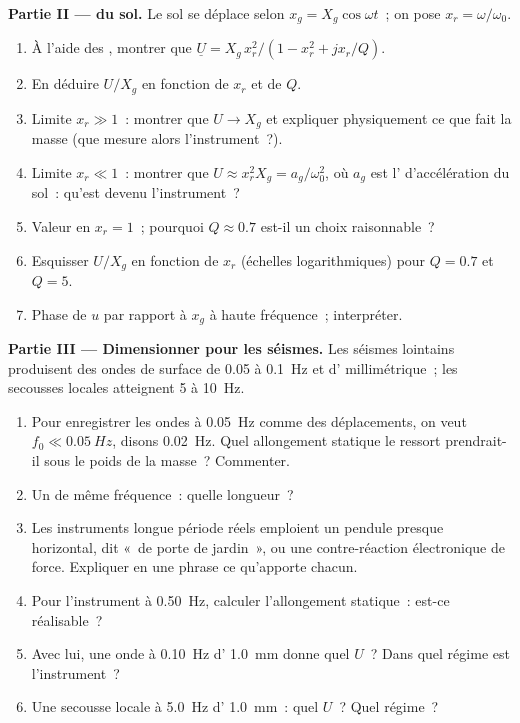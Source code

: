 \begin{problem}
\medskip
\noindent\textbf{Partie II ---  du sol.}
Le sol se déplace selon $x_g = X_g\cos\omega t$~; on pose $x_r = \omega/\omega_0$.
\begin{enumerate}[resume]
  \item À l'aide des , montrer que $\underline U = X_g\,x_r^2/
        (1 - x_r^2 + jx_r/Q)$.
  \item En déduire $U/X_g$ en fonction de $x_r$ et de $Q$.
  \item Limite $x_r \gg 1$~: montrer que $U \to X_g$ et expliquer
        physiquement ce que fait la masse (que mesure alors
        l'instrument~?).
  \item Limite $x_r \ll 1$~: montrer que $U \approx x_r^2X_g = a_g/\omega_0^2$, où
        $a_g$ est l' d'accélération du sol~: qu'est devenu
        l'instrument~?
  \item Valeur en $x_r = 1$~; pourquoi $Q \approx 0.7$ est-il un choix
        raisonnable~?
  \item Esquisser $U/X_g$ en fonction de $x_r$ (échelles logarithmiques)
        pour $Q = 0.7$ et $Q = 5$.
  \item Phase de $u$ par rapport à $x_g$ à haute fréquence~; interpréter.
\end{enumerate}

\medskip
\noindent\textbf{Partie III --- Dimensionner pour les séismes.}
Les séismes lointains produisent des ondes de surface de \qty{0.05}{} à
\qty{0.1}{Hz} et d' millimétrique~; les secousses locales
atteignent \qty{5}{} à \qty{10}{Hz}.
\begin{enumerate}[resume]
  \item Pour enregistrer les ondes à \qty{0.05}{Hz} comme des
        déplacements, on veut $f_0 \ll \qty{0.05}{Hz}$, disons
        \qty{0.02}{Hz}. Quel allongement statique le ressort
        prendrait-il sous le poids de la masse~? Commenter.
  \item Un  de même fréquence~: quelle longueur~?
  \item Les instruments longue période réels emploient un pendule
        presque horizontal, dit «~de porte de jardin~», ou une
        contre-réaction électronique de force. Expliquer en une phrase ce
        qu'apporte chacun.
  \item Pour l'instrument à \qty{0.50}{Hz}, calculer l'allongement
        statique~: est-ce réalisable~?
  \item Avec lui, une onde à \qty{0.10}{Hz} d' \qty{1.0}{mm}
        donne quel $U$~? Dans quel régime est l'instrument~?
  \item Une secousse locale à \qty{5.0}{Hz} d' \qty{1.0}{mm}~:
        quel $U$~? Quel régime~?
\end{enumerate}


\end{problem}
